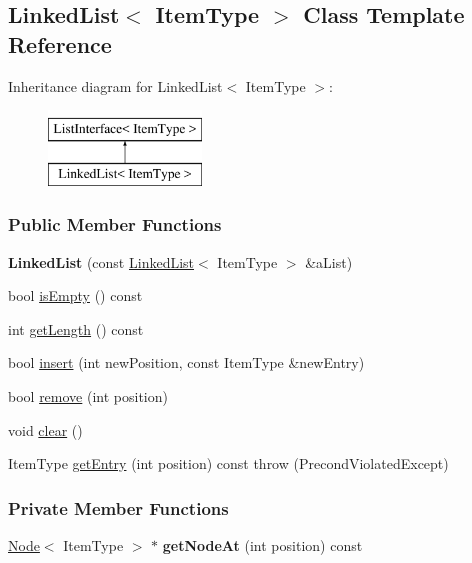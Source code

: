 \hypertarget{class_linked_list}{}\subsection{Linked\+List$<$ Item\+Type $>$ Class Template Reference}
\label{class_linked_list}
Inheritance diagram for Linked\+List$<$ Item\+Type $>$\+:\begin{figure}[H]
\begin{center}
\leavevmode
\includegraphics[height=2.000000cm]{class_linked_list}
\end{center}
\end{figure}
\subsubsection*{Public Member Functions}
\begin{DoxyCompactItemize}
\item 
{\bfseries Linked\+List} (const \hyperlink{class_linked_list}{Linked\+List}$<$ Item\+Type $>$ \&a\+List)\hypertarget{class_linked_list_a6f1443c6120352f1f5b6bd3c0d95e41e}{}\label{class_linked_list_a6f1443c6120352f1f5b6bd3c0d95e41e}

\item 
bool \hyperlink{class_linked_list_adb17aed0ceacbbe1f247d235f491f0d5}{is\+Empty} () const 
\item 
int \hyperlink{class_linked_list_adae55d6b79235c816cb9e05027fd2e7a}{get\+Length} () const 
\item 
bool \hyperlink{class_linked_list_ae8a19375505e87e2e4fc0e9b5afe4d4d}{insert} (int new\+Position, const Item\+Type \&new\+Entry)
\item 
bool \hyperlink{class_linked_list_a16a02716b5b2efb6fb1e3d18721b53e4}{remove} (int position)
\item 
void \hyperlink{class_linked_list_a7d1d9cf83eef67b6c4d700a3cc5970e1}{clear} ()
\item 
Item\+Type \hyperlink{class_linked_list_a79f005e696c19f6ccf90d9d535afa999}{get\+Entry} (int position) const   throw (\+Precond\+Violated\+Except)
\end{DoxyCompactItemize}
\subsubsection*{Private Member Functions}
\begin{DoxyCompactItemize}
\item 
\hyperlink{class_node}{Node}$<$ Item\+Type $>$ $\ast$ {\bfseries get\+Node\+At} (int position) const \hypertarget{class_linked_list_aa6c640ac15f70a1e08ba92dc060e4a0e}{}\label{class_linked_list_aa6c640ac15f70a1e08ba92dc060e4a0e}

\end{DoxyCompactItemize}
